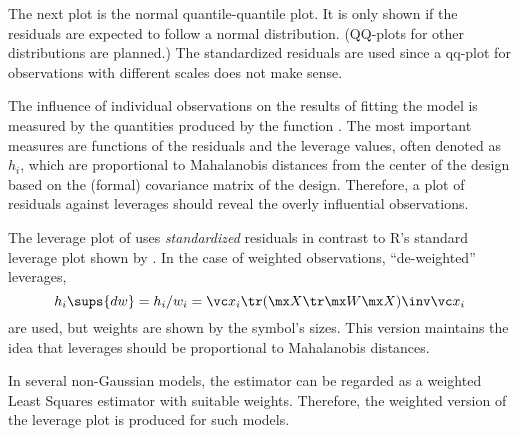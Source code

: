 \documentclass[11pt]{article}
\begin{document}


The next plot is the normal quantile-quantile plot. It is only shown if the
residuals are expected to follow a normal distribution.
(QQ-plots for other distributions are planned.)
The standardized residuals are used since a qq-plot for observations with 
different scales does not make sense.

The influence of individual observations on the results of fitting the model
is measured by the quantities produced by the function .
The most important measures are functions of the residuals and the 
leverage values, often denoted as $h_i$, which are proportional to
Mahalanobis distances from the center of the design based on the 
(formal) covariance matrix of the design.
Therefore, a plot of residuals against leverages should reveal the overly
influential observations.

The leverage plot of  uses \emph{standardized} residuals
in contrast to R's standard leverage plot shown by .
In the case of weighted observations, ``de-weighted'' leverages,
\[
  h_i\sups{dw} = h_i/w_i = \vc x_i\tr (\mx X\tr \mx W \mx X)\inv \vc x_i
\]
are used, but weights are shown by the symbol's sizes.
This version maintains the idea that leverages should be proportional to 
Mahalanobis distances.


In several non-Gaussian models, the estimator can be regarded as a weighted
Least Squares estimator with suitable weights. 
Therefore, the weighted version of the leverage plot is produced for such
models. 
\end{document}
